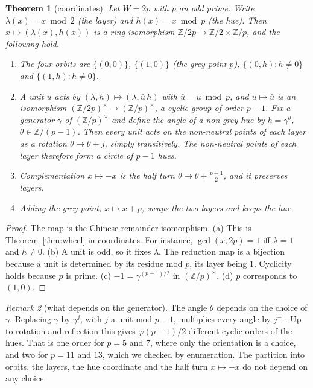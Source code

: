 \documentclass[11pt]{article}
\newcommand{\Z}{\mathbb Z}
\theoremstyle{plain}
\newtheorem{theorem}{Theorem}
\theoremstyle{definition}
\theoremstyle{remark}
\newtheorem{remark}[theorem]{Remark}
\begin{document}
\begin{theorem}[coordinates]\label{thm:coords}
Let $W=2p$ with $p$ an odd prime. Write $\lambda(x)=x\bmod2$ (the \emph{layer}) and $h(x)=x\bmod p$
(the \emph{hue}). Then $x\mapsto(\lambda(x),h(x))$ is a ring isomorphism $\Z/2p\to\Z/2\times\Z/p$,
and the following hold.
\begin{enumerate}[nosep]
\item[(a)] The four orbits are $\{(0,0)\}$, $\{(1,0)\}$ (the \emph{grey} point $p$),
$\{(0,h):h\ne0\}$ and $\{(1,h):h\ne0\}$.
\item[(b)] A unit $u$ acts by $(\lambda,h)\mapsto(\lambda,\bar u\,h)$ with $\bar u=u\bmod p$, and
$u\mapsto\bar u$ is an isomorphism $(\Z/2p)^\times\to(\Z/p)^\times$, a cyclic group of order $p-1$.
Fix a generator $\gamma$ of $(\Z/p)^\times$ and define the \emph{angle} of a non-grey hue by
$h=\gamma^{\theta}$, $\theta\in\Z/(p-1)$. Then every unit acts on the non-neutral points of each layer as a
rotation $\theta\mapsto\theta+j$, simply transitively. The non-neutral points of each layer
therefore form a circle of $p-1$ hues.
\item[(c)] Complementation $x\mapsto-x$ is the half turn $\theta\mapsto\theta+\tfrac{p-1}2$, and it
preserves layers.
\item[(d)] Adding the grey point, $x\mapsto x+p$, swaps the two layers and keeps the hue.
\end{enumerate}
\end{theorem}
\begin{proof}
The map is the Chinese remainder isomorphism. (a) This is Theorem~\ref{thm:wheel} in coordinates.
For instance, $\gcd(x,2p)=1$ iff $\lambda=1$ and $h\ne0$. (b) A unit is odd, so it fixes $\lambda$.
The reduction map is a bijection because a unit is determined by its residue mod $p$, its layer
being $1$. Cyclicity holds because $p$ is prime. (c) $-1=\gamma^{(p-1)/2}$ in $(\Z/p)^\times$.
(d) $p$ corresponds to $(1,0)$.
\end{proof}

\begin{remark}[what depends on the generator]\label{rem:gen}
The angle $\theta$ depends on the choice of $\gamma$. Replacing $\gamma$ by $\gamma^{j}$, with $j$
a unit mod $p-1$, multiplies every angle by $j^{-1}$. Up to rotation and reflection this gives
$\varphi(p-1)/2$ different cyclic orders of the hues. That is one order for $p=5$ and $7$, where
only the orientation is a choice, and two for $p=11$ and $13$, which we checked by enumeration. The
partition into orbits, the layers, the hue coordinate and the half turn $x\mapsto-x$ do not depend
on any choice.
\end{remark}
\end{document}
